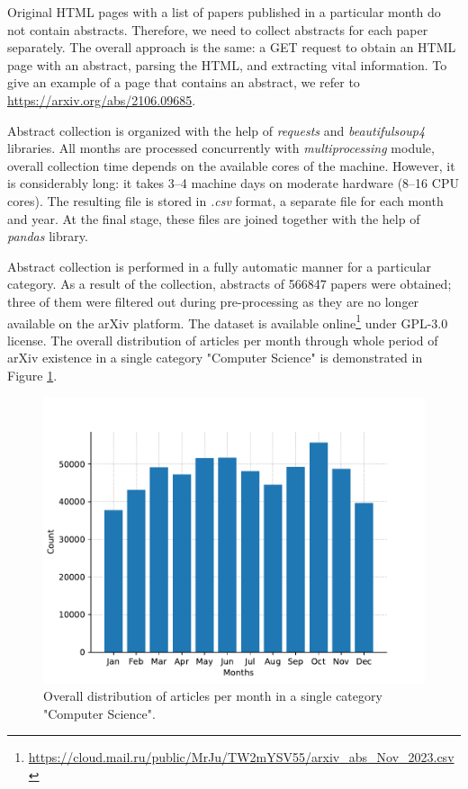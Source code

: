 \documentclass{article}
\begin{document}
        Original HTML pages with a list of papers published in a particular month do not contain abstracts. Therefore, we need to collect abstracts for each paper separately. The overall approach is the same: a GET request to obtain an HTML page with an abstract, parsing the HTML, and extracting vital information. To give an example of a page that contains an abstract, we refer to \url{https://arxiv.org/abs/2106.09685}.

        Abstract collection is organized with the help of \textit{requests} and \textit{beautifulsoup4} libraries. All months are processed concurrently with \textit{multiprocessing} module, overall collection time depends on the available cores of the machine. However, it is considerably long: it takes 3--4 machine days on moderate hardware (8--16 CPU cores). The resulting file is stored in \textit{.csv} format, a separate file for each month and year. At the final stage, these files are joined together with the help of \textit{pandas} library.

        Abstract collection is performed in a fully automatic manner for a particular category. As a result of the collection, abstracts of 566847 papers were obtained; three of them were filtered out during pre-processing as they are no longer available on the arXiv platform. The dataset is available online\footnote{\url{https://cloud.mail.ru/public/MrJu/TW2mYSV55/arxiv_abs_Nov_2023.csv}} under GPL-3.0 license. The overall distribution of articles per month through whole period of arXiv existence in a single category "Computer Science" is demonstrated in Figure \ref{fig:articles-bars}.

        \begin{figure}[H]
            \centering
            \includegraphics[width=0.8\linewidth]{img/number_of_articles_by_month.pdf}
            \caption{Overall distribution of articles per month in a single category "Computer Science".}
            \label{fig:articles-bars}
        \end{figure}
\end{document}
